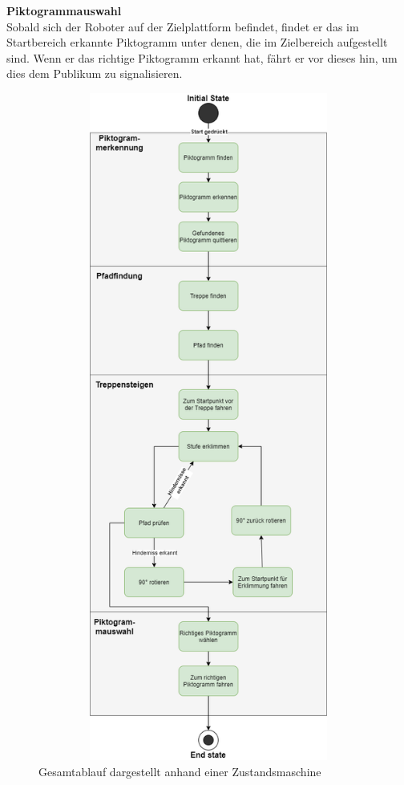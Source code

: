 \textbf{Piktogrammauswahl}\\
Sobald sich der Roboter auf der Zielplattform befindet, findet er das im Startbereich erkannte Piktogramm unter denen, die im Zielbereich aufgestellt sind. Wenn er das richtige Piktogramm erkannt hat, fährt er vor dieses hin, um dies dem Publikum zu signalisieren.
\begin{figure}[H]
\begin{center}
    \includegraphics[width=15cm,height=22cm,keepaspectratio]{img/Statemachine.png}
    \caption{Gesamtablauf dargestellt anhand einer Zustandsmaschine}
    \label{fig:gesamtablaufplan}
\end{center}
\end{figure}

